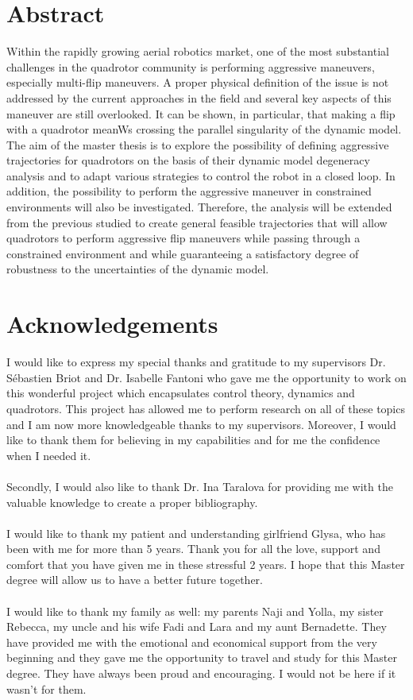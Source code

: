 \documentclass{thesisreport}
\begin{document}
   
 
  \section*{Abstract}
Within the rapidly growing aerial robotics market, one of the most substantial challenges in the quadrotor community is performing aggressive maneuvers, especially multi-flip maneuvers.  A proper physical definition of the issue is not addressed by the current approaches in the field and several key aspects of this maneuver are still overlooked.
It can be shown, in particular, that making a flip with a quadrotor meanWs crossing the parallel singularity of the dynamic model. The aim of the master thesis is to explore the possibility of defining aggressive trajectories for quadrotors on the basis of their dynamic model degeneracy analysis and to adapt various strategies to control the robot in a closed loop. In addition, the possibility to perform the aggressive maneuver in constrained environments will also be investigated.
Therefore, the analysis will be extended from the previous studied to create general feasible trajectories that will allow quadrotors to perform aggressive flip maneuvers while passing through a constrained environment and while guaranteeing a satisfactory degree of robustness to the uncertainties of the dynamic model.

 
 \newpage
 
 \section*{Acknowledgements}


I would like to express my special thanks and gratitude to my supervisors Dr. Sébastien Briot and Dr. Isabelle Fantoni who gave me the  opportunity to work on this wonderful project which encapsulates control theory, dynamics and quadrotors. This project has allowed me to perform research on all of these topics and I am now more knowledgeable thanks to my supervisors. Moreover, I would like to thank them for believing in my capabilities and for me the confidence when I needed it. \\\\
Secondly, I would also like to thank Dr. Ina Taralova for providing me with the valuable knowledge to create a proper bibliography. \\\\
I would like to thank my patient and understanding girlfriend Glysa, who has been with me for more than 5 years. Thank you for all the love, support and comfort that you have given me in these stressful 2 years. I hope that this Master degree will allow us to have a better future together. \\\\
I would like to thank my family as well: my parents Naji and Yolla, my sister Rebecca, my uncle and his wife Fadi and Lara and my aunt Bernadette. They have provided me with the emotional and economical support from the very beginning and they gave me the opportunity to travel and study for this Master degree. They have always been proud and encouraging. I would not be here if it wasn't for them.
\end{document}
